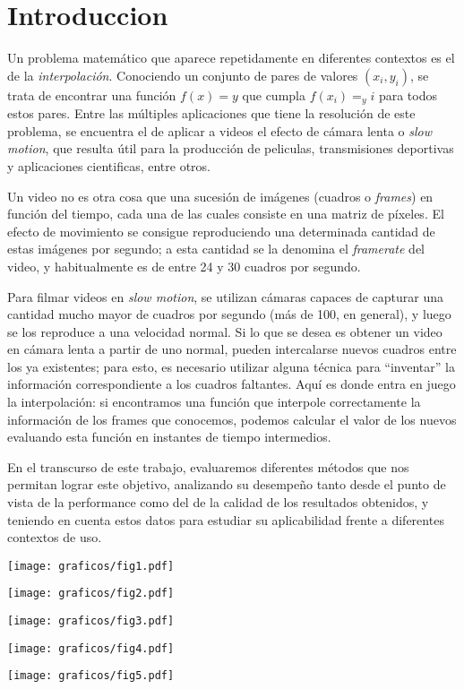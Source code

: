\section{Introduccion}
    Un problema matemático que aparece repetidamente en diferentes contextos es el de la \emph{interpolación}. Conociendo un conjunto de pares de valores $(x_i, y_i)$, se trata de encontrar una función $f(x) = y$ que cumpla $f(x_i) =_ yi$ para todos estos pares. Entre las múltiples aplicaciones que tiene la resolución de este problema, se encuentra el de aplicar a videos el efecto de cámara lenta o \emph{slow motion}, que resulta útil para la producción de peliculas, transmisiones deportivas y aplicaciones cientificas, entre otros.

    Un video no es otra cosa que una sucesión de imágenes (cuadros o \emph{frames}) en función del tiempo, cada una de las cuales consiste en una matriz de píxeles. El efecto de movimiento se consigue reproduciendo una determinada cantidad de estas imágenes por segundo; a esta cantidad se la denomina el \emph{framerate} del video, y habitualmente es de entre 24 y 30 cuadros por segundo.

    Para filmar videos en \emph{slow motion}, se utilizan cámaras capaces de capturar una cantidad mucho mayor de cuadros por segundo (más de 100, en general), y luego se los reproduce a una velocidad normal. Si lo que se desea es obtener un video en cámara lenta a partir de uno normal, pueden intercalarse nuevos cuadros entre los ya existentes; para esto, es necesario utilizar alguna técnica para ``inventar'' la información correspondiente a los cuadros faltantes. Aquí es donde entra en juego la interpolación: si encontramos una función que interpole correctamente la información de los frames que conocemos, podemos calcular el valor de los nuevos evaluando esta función en instantes de tiempo intermedios.

    En el transcurso de este trabajo, evaluaremos diferentes métodos que nos permitan lograr este objetivo, analizando su desempeño tanto desde el punto de vista de la performance como del de la calidad de los resultados obtenidos, y teniendo en cuenta estos datos para estudiar su aplicabilidad frente a diferentes contextos de uso.

    \begin{center}
      \texttt{[image: graficos/fig1.pdf]}
    \end{center}

    \begin{center}
      \texttt{[image: graficos/fig2.pdf]}
    \end{center}

    \begin{center}
      \texttt{[image: graficos/fig3.pdf]}
    \end{center}

        \begin{center}
      \texttt{[image: graficos/fig4.pdf]}
    \end{center}

        \begin{center}
      \texttt{[image: graficos/fig5.pdf]}
    \end{center}
